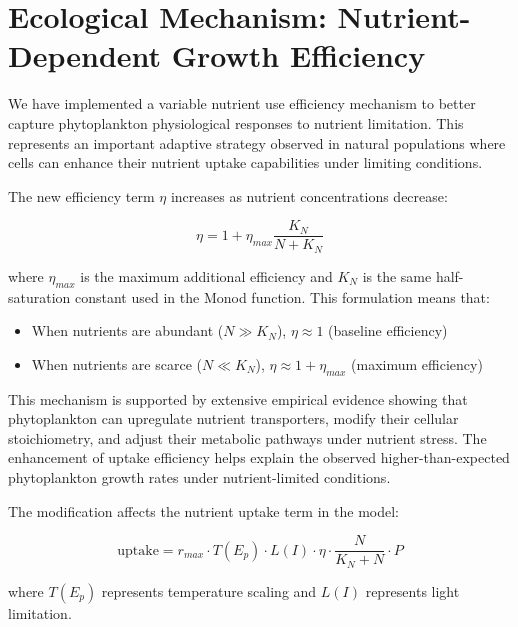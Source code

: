\section{Ecological Mechanism: Nutrient-Dependent Growth Efficiency}

We have implemented a variable nutrient use efficiency mechanism to better capture phytoplankton physiological responses to nutrient limitation. This represents an important adaptive strategy observed in natural populations where cells can enhance their nutrient uptake capabilities under limiting conditions.

The new efficiency term $\eta$ increases as nutrient concentrations decrease:

\[ \eta = 1 + \eta_{max} \frac{K_N}{N + K_N} \]

where $\eta_{max}$ is the maximum additional efficiency and $K_N$ is the same half-saturation constant used in the Monod function. This formulation means that:

\begin{itemize}
\item When nutrients are abundant ($N \gg K_N$), $\eta \approx 1$ (baseline efficiency)
\item When nutrients are scarce ($N \ll K_N$), $\eta \approx 1 + \eta_{max}$ (maximum efficiency)
\end{itemize}

This mechanism is supported by extensive empirical evidence showing that phytoplankton can upregulate nutrient transporters, modify their cellular stoichiometry, and adjust their metabolic pathways under nutrient stress. The enhancement of uptake efficiency helps explain the observed higher-than-expected phytoplankton growth rates under nutrient-limited conditions.

The modification affects the nutrient uptake term in the model:

\[ \text{uptake} = r_{max} \cdot T(E_p) \cdot L(I) \cdot \eta \cdot \frac{N}{K_N + N} \cdot P \]

where $T(E_p)$ represents temperature scaling and $L(I)$ represents light limitation.

